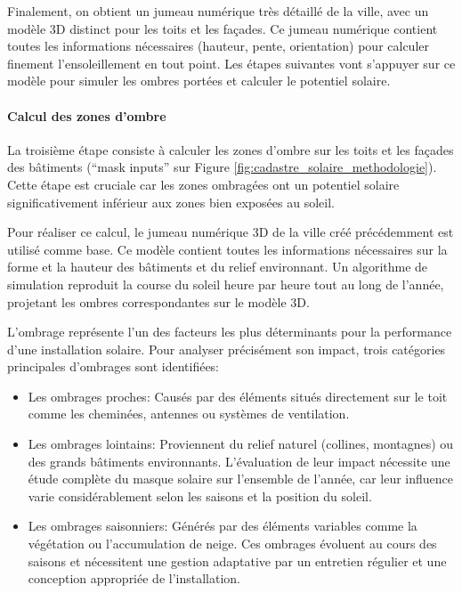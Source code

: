 \par{Finalement, on obtient un jumeau numérique très détaillé de la ville, avec un modèle 3D distinct pour les toits et les façades. Ce jumeau numérique contient toutes les informations nécessaires (hauteur, pente, orientation) pour calculer finement l'ensoleillement en tout point. Les étapes suivantes vont s'appuyer sur ce modèle pour simuler les ombres portées et calculer le potentiel solaire.}

\paragraph{Calcul des zones d'ombre}
\par{La troisième étape consiste à calculer les zones d'ombre sur les toits et les façades des bâtiments (``mask inputs'' sur Figure \ref{fig:cadastre_solaire_methodologie}). Cette étape est cruciale car les zones ombragées ont un potentiel solaire significativement inférieur aux zones bien exposées au soleil.}
\par{Pour réaliser ce calcul, le jumeau numérique 3D de la ville créé précédemment est utilisé comme base. Ce modèle contient toutes les informations nécessaires sur la forme et la hauteur des bâtiments et du relief environnant. Un algorithme de simulation reproduit la course du soleil heure par heure tout au long de l'année, projetant les ombres correspondantes sur le modèle 3D.}
\par{L'ombrage représente l'un des facteurs les plus déterminants pour la performance d'une installation solaire. Pour analyser précisément son impact, trois catégories principales d'ombrages sont identifiées:}
\begin{itemize}
    \item Les ombrages proches: Causés par des éléments situés directement sur le toit comme les cheminées, antennes ou systèmes de ventilation.
    \item Les ombrages lointains: Proviennent du relief naturel (collines, montagnes) ou des grands bâtiments environnants. L'évaluation de leur impact nécessite une étude complète du masque solaire sur l'ensemble de l'année, car leur influence varie considérablement selon les saisons et la position du soleil.
    \item Les ombrages saisonniers: Générés par des éléments variables comme la végétation ou l'accumulation de neige. Ces ombrages évoluent au cours des saisons et nécessitent une gestion adaptative par un entretien régulier et une conception appropriée de l'installation.
\end{itemize}
